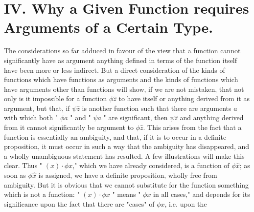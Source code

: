 \documentclass[10pt]{article}
\begin{document}
\section*{IV. Why a Given Function requires Arguments of a Certain Type.}
The considerations so far adduced in favour of the view that a function cannot significantly have as argument anything defined in terms of the function itself have been more or less indirect. But a direct consideration of the kinds of functions which have functions as arguments and the kinds of functions which have arguments other than functions will show, if we are not mistaken, that not only is it impossible for a function $\phi \hat{z}$ to have itself or anything derived from it as argument, but that, if $\psi \hat{z}$ is another function such that there are arguments $a$ with which both " $\phi a$ " and " $\psi a$ " are significant, then $\psi \hat{z}$ and anything derived from it cannot significantly be argument to $\phi \hat{z}$. This arises from the fact that a function is essentially an ambiguity, and that, if it is to occur in a definite proposition, it must occur in such a way that the ambiguity has disappeared, and a wholly unambiguous statement has resulted. A few illustrations will make this clear. Thus " $(x) \cdot \phi x$," which we have already considered, is a function of $\phi \hat{x}$; as soon as $\phi \hat{x}$ is assigned, we have a definite proposition, wholly free from ambiguity. But it is obvious that we cannot substitute for the function something which is not a function: " $(x) \cdot \phi x$ " means " $\phi x$ in all cases," and depends for its significance upon the fact that there are "cases" of $\phi x$, i.e. upon the\\
\end{document}

